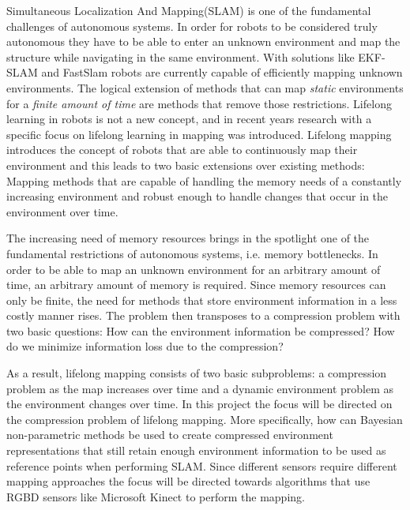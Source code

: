 \documentclass[twoside,hidelinks]{article}
\begin{document}
Simultaneous Localization And Mapping(SLAM) is one of the fundamental challenges of autonomous systems\cite{probRobs}. In order for robots to be considered truly autonomous they have to be able to enter an unknown environment and map the structure while navigating in the same environment. With solutions like EKF-SLAM\cite{ekf} and FastSlam\cite{SLAM} robots are currently capable of efficiently mapping unknown environments. The logical extension of methods that can map \textit{static} environments for a \textit{finite amount of time} are methods that remove those restrictions. Lifelong learning in robots is not a new concept\cite{liflonglearning}, and in recent years research with a specific focus on lifelong learning in mapping\cite{lifelongmaps} was introduced.  Lifelong mapping introduces the concept of robots that are able to continuously map their environment and this leads to two basic extensions over existing methods: Mapping methods that are capable of handling the memory needs of a constantly increasing environment and robust enough to handle changes that occur in the environment over time. 

The increasing need of memory resources brings in the spotlight one of the fundamental restrictions of autonomous systems, i.e. memory bottlenecks. In order to be able to map an unknown environment for an arbitrary amount of time, an arbitrary amount of memory is required. Since memory resources can only be finite, the need for methods that store environment information in a less costly manner rises. The problem then transposes to a compression problem with two basic questions: How can the environment information be compressed? How do we minimize information loss due to the compression?

As a result, lifelong mapping consists of two basic subproblems: a compression problem as the map increases over time and a dynamic environment problem as the environment changes over time\cite{aishalong}. In this project the focus will be directed on the compression problem of lifelong mapping. More specifically, how can Bayesian non-parametric methods be used to create compressed environment representations that still retain enough environment information to be used as reference points when performing SLAM. Since different sensors require different mapping approaches the focus will be directed towards algorithms that use RGBD sensors like Microsoft Kinect to perform the mapping. 
\end{document}
